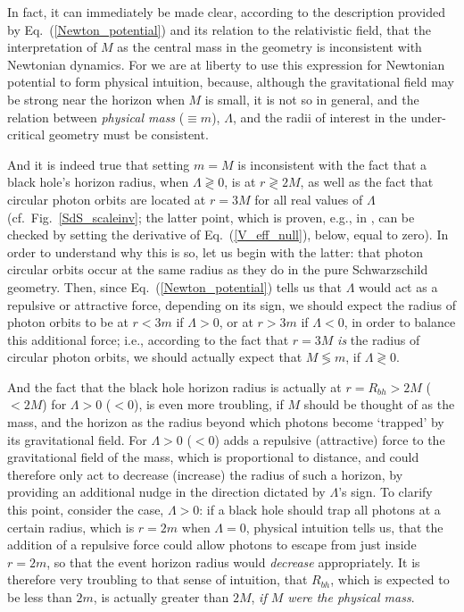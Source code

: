 In fact, it can immediately be made clear, according to the description provided by Eq.~(\ref{Newton_potential}) and its relation to the relativistic field, that the interpretation of $M$ as the central mass in the geometry is inconsistent with Newtonian dynamics. For we are at liberty to use this expression for Newtonian potential to form physical intuition, because, although the gravitational field may be strong near the horizon when $M$ is small, it is not so in general, and the relation between \textit{physical mass} ($\equiv{m}$), $\Lambda$, and the radii of interest in the under-critical geometry must be consistent. 

And it is indeed true that setting $m=M$ is inconsistent with the fact that a black hole's horizon radius, when $\Lambda\gtrless0$, is at $r\gtrless2M$, as well as the fact that circular photon orbits are located at $r=3M$ for all real values of $\Lambda$ (cf.~Fig.~\ref{SdS_scaleinv}; the latter point, which is proven, e.g., in \cite{Stuchlik1983,Stuchlik1999}, can be checked by setting the derivative of Eq.~(\ref{V_eff_null}), below, equal to zero). In order to understand why this is so, let us begin with the latter: that photon circular orbits occur at the same radius as they do in the pure Schwarzschild geometry. Then, since Eq.~(\ref{Newton_potential}) tells us that $\Lambda$ would act as a repulsive or attractive force, depending on its sign, we should expect the radius of photon orbits to be at $r<3m$ if $\Lambda>0$, or at $r>3m$ if $\Lambda<0$, in order to balance this additional force; i.e., according to the fact that $r=3M$ \textit{is} the radius of circular photon orbits, we should actually expect that $M\lessgtr{m}$, if $\Lambda\gtrless0$.

And the fact that the black hole horizon radius is actually at $r=R_{bh}>2M$ ($<2M$) for $\Lambda>0$ ($<0$), is even more troubling, if $M$ should be thought of as the mass, and the horizon as the radius beyond which photons become `trapped' by its gravitational field. For $\Lambda>0$ ($<0$) adds a repulsive (attractive) force to the gravitational field of the mass, which is proportional to distance, and could therefore only act to decrease (increase) the radius of such a horizon, by providing an additional nudge in the direction dictated by $\Lambda$'s sign. To clarify this point, consider the case, $\Lambda>0$: if a black hole should trap all photons at a certain radius, which is $r=2m$ when $\Lambda=0$, physical intuition tells us, that the addition of a repulsive force could allow photons to escape from just inside $r=2m$, so that the event horizon radius would \textit{decrease} appropriately. It is therefore very troubling to that sense of intuition, that $R_{bh}$, which is expected to be less than $2m$, is actually greater than $2M$, \textit{if $M$ were the physical mass}.


